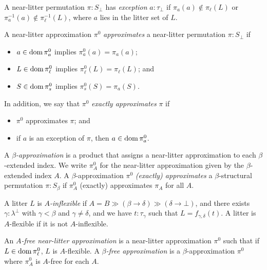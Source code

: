 \documentclass{article}
\begin{document}
\begin{definition}
    A near-litter permutation \( \pi : S_\bot \) has \emph{exception} \( a : \tau_\bot \) if \( \pi_a(a) \not\in \pi_\ell(L) \) or \( \pi^{-1}_a(a) \not\in \pi^{-1}_\ell(L) \), where \( a \) lies in the litter set of \( L \).
\end{definition}
\begin{definition}
    A near-litter approximation \( \pi^0 \) \emph{approximates} a near-litter permutation \( \pi : S_\bot \) if
    \begin{itemize}
        \item \( a \in \operatorname{dom} \pi^0_a \) implies \( \pi^0_a(a) = \pi_a(a) \);
        \item \( L \in \operatorname{dom} \pi^0_\ell \) implies \( \pi^0_\ell(L) = \pi_\ell(L) \); and
        \item \( S \in \operatorname{dom} \pi^0_s \) implies \( \pi^0_s(S) = \pi_a(S) \).
    \end{itemize}
    In addition, we say that \( \pi^0 \) \emph{exactly approximates} \( \pi \) if
    \begin{itemize}
        \item \( \pi^0 \) approximates \( \pi \); and
        \item if \( a \) is an exception of \( \pi \), then \( a \in \operatorname{dom} \pi^0_a \).
    \end{itemize}
\end{definition}
\begin{definition}
    A \emph{\( \beta \)-approximation} is a product that assigns a near-litter approximation to each \( \beta \)-extended index.
    We write \( \pi^0_A \) for the near-litter approximation given by the \( \beta \)-extended index \( A \).
    A \( \beta \)-approximation \( \pi^0 \) \emph{(exactly) approximates} a \( \beta \)-structural permutation \( \pi : S_\beta \) if \( \pi^0_A \) (exactly) approximates \( \pi_A \) for all \( A \).
\end{definition}
\begin{definition}
    A litter \( L \) is \emph{\( A \)-inflexible} if \( A = B \gg (\beta \longrightarrow \delta) \gg (\delta \longrightarrow \bot) \), and there exists \( \gamma : \lambda^\bot \) with \( \gamma < \beta \) and \( \gamma \neq \delta \), and we have \( t : \tau_\gamma \) such that \( L = f_{\gamma,\delta}(t) \).
    A litter is \( A \)-flexible if it is not \( A \)-inflexible.
\end{definition}
\begin{definition}
    An \emph{\( A \)-free near-litter approximation} is a near-litter approximation \( \pi^0 \) such that if \( L \in \operatorname{dom} \pi^0_\ell \), \( L \) is \( A \)-flexible.
    A \emph{\( \beta \)-free approximation} is a \( \beta \)-approximation \( \pi^0 \) where \( \pi^0_A \) is \( A \)-free for each \( A \).
\end{definition}
\end{document}
